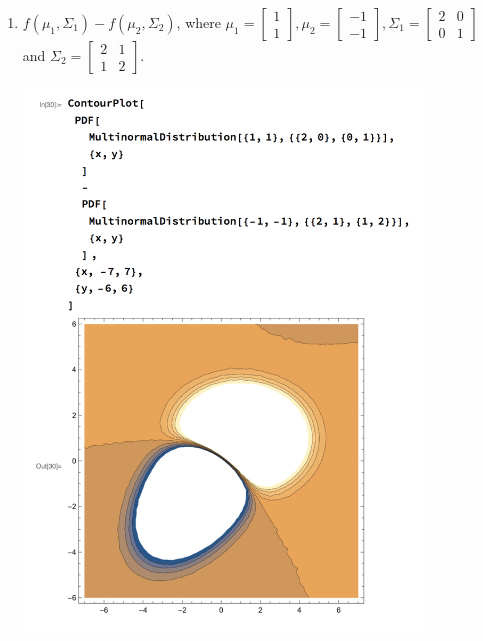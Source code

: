 \begin{enumerate}[label=(\alph*)]
    \newpage
    \item $f(\mu_1, \Sigma_1) - f(\mu_2, \Sigma_2)$, where $\mu_1 = \begin{bmatrix} 1 \\ 1 \end{bmatrix}, \mu_2 = \begin{bmatrix} -1 \\ -1 \end{bmatrix}, \Sigma_1 = \begin{bmatrix} 2 & 0 \\ 0 & 1 \end{bmatrix}$ and $\Sigma_2 = \begin{bmatrix} 2 & 1 \\ 1 & 2 \end{bmatrix}$.
    \begin{mdframed}
      \includegraphics[width=300pt]{img/hw03_2e.png}
    \end{mdframed}

\end{enumerate}

\newpage
